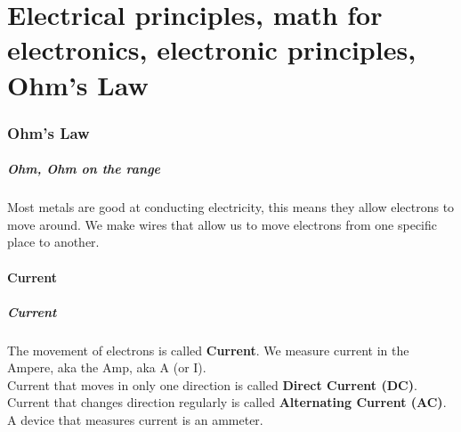 \documentclass[10pt]{beamer}
\begin{document}
\part{Electrical principles, math for electronics, electronic principles, Ohm's Law}
\section{Ohm's Law}
\begin{frame}
\frametitle{Ohm, Ohm on the range}
Most metals are good at conducting electricity, this means they allow electrons to move around. We make wires that allow us to move electrons from one specific place to another.
\end{frame}
\subsection{Current}
\begin{frame}
\frametitle{Current}
The movement of electrons is called \textbf{Current}. We measure current in the Ampere, aka the Amp, aka A (or I).\\
Current that moves in only one direction is called \textbf{Direct Current (DC)}. Current that changes direction regularly is called \textbf{Alternating Current (AC)}.\\
A device that measures current is an ammeter.
\end{frame}
\end{document}
